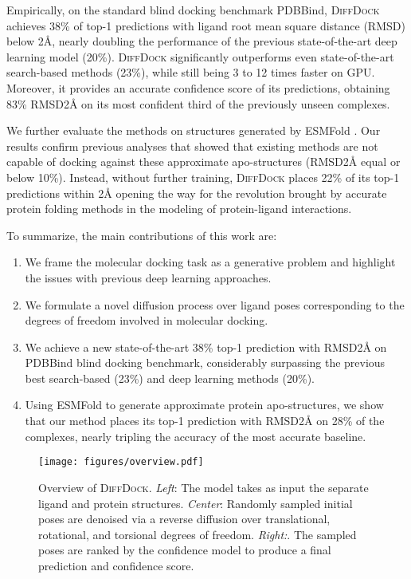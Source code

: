 \documentclass{article} \usepackage{iclr2023_conference,times}
\newcommand{\new}[1]{#1}
\begin{document}
Empirically, on the standard blind docking benchmark PDBBind, \textsc{DiffDock} achieves 38\% of top-1 predictions with ligand root mean square distance (RMSD) below 2\AA{}, nearly doubling the performance of the previous state-of-the-art deep learning model (20\%). \textsc{DiffDock} significantly outperforms even state-of-the-art search-based methods (23\%), 
while still being 3 to 12 times faster on GPU. Moreover, it provides an accurate confidence score of its predictions, obtaining 8\new{3}\% RMSD2\AA{} on its most confident third of the previously unseen complexes.

We further evaluate the methods on structures generated by ESMFold \citep{Lin2022ESM2}. Our results confirm previous analyses \citep{wong2022benchmarking} that showed that existing methods are not capable of docking against these approximate apo-structures (RMSD2\AA{} equal or below 10\%). Instead, without further training, \textsc{DiffDock} places 22\% of its top-1 predictions within 2\AA{} opening the way for the revolution brought by accurate protein folding methods in the modeling of protein-ligand interactions.

To summarize, the main contributions of this work are:
\begin{enumerate}
    \item We frame the molecular docking task as a generative problem and highlight the issues with previous deep learning approaches.
    \item We formulate a novel diffusion process over ligand poses corresponding to the degrees of freedom involved in molecular docking.
    \item We achieve a new state-of-the-art 38\% top-1 prediction with RMSD2\AA{} on PDBBind blind docking benchmark, considerably surpassing the previous best search-based (23\%) and deep learning methods (20\%).
    \item Using ESMFold to generate approximate protein apo-structures, we show that our method places its top-1 prediction with RMSD2\AA{} on 28\% of the complexes, nearly tripling the accuracy of the most accurate baseline.
\end{enumerate}

\begin{figure}[t]
    \centering
    \texttt{[image: figures/overview.pdf]}
    \caption{Overview of \textsc{DiffDock}. \emph{Left}: The model takes as input the separate ligand and protein structures. \emph{Center}: Randomly sampled initial poses are denoised via a reverse diffusion over translational, rotational, and torsional degrees of freedom. \emph{Right:}. The sampled poses are ranked by the confidence model to produce a final prediction and confidence score.}
    \label{fig:overview}
\end{figure}
\end{document}
